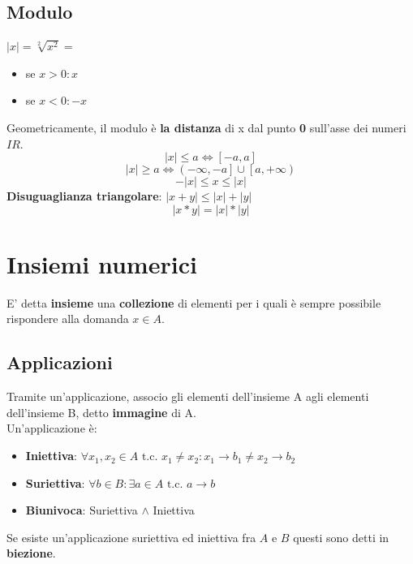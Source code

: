 \documentclass{report}
\begin{document}
    \subsection{Modulo}
        $ |x| = \sqrt[2]{x^2} = $
        \begin{itemize}
            \item se $x > 0: x $
            \item se $x < 0: -x $
        \end{itemize}
        Geometricamente, il modulo è \textbf{la distanza} di x dal punto \textbf{0} sull'asse dei numeri $I\!R$. \\
        $$ |x| \leq a \Longleftrightarrow \left[ -a, a \right] $$
        $$ |x| \geq a \Longleftrightarrow \left( -\infty, -a \right] \cup \left[ a, +\infty \right) $$
        $$ -|x| \leq x \leq |x| $$ 
        \textbf{Disuguaglianza triangolare}: $|x + y| \leq |x| + |y|$
        $$ |x * y| = |x| * |y| $$
\section{Insiemi numerici}
    E' detta \textbf{insieme} una \textbf{collezione} di elementi per i quali è 
    sempre possibile rispondere alla domanda $x \in A$.
    \subsection{Applicazioni}
    Tramite un'applicazione, associo gli elementi dell'insieme A
    agli elementi dell'insieme B, detto \textbf{immagine} di A. \\
    Un'applicazione è:
    \begin{itemize}
        \item \textbf{Iniettiva}: $
            \forall x_1, x_2 \in A \textrm{ t.c. } x_1 \neq x_2:
            x_1 \rightarrow b_1 \neq x_2 \rightarrow b_2
        $
        \item \textbf{Suriettiva}: $\forall b \in B: 
            \exists a \in A \textrm{ t.c. } a \rightarrow b
        $
        \item \textbf{Biunivoca}: Suriettiva $\wedge$ Iniettiva
    \end{itemize}
    Se esiste un'applicazione suriettiva ed iniettiva fra $A$ e $B$ questi sono
    detti in \textbf{biezione}.
\end{document}
